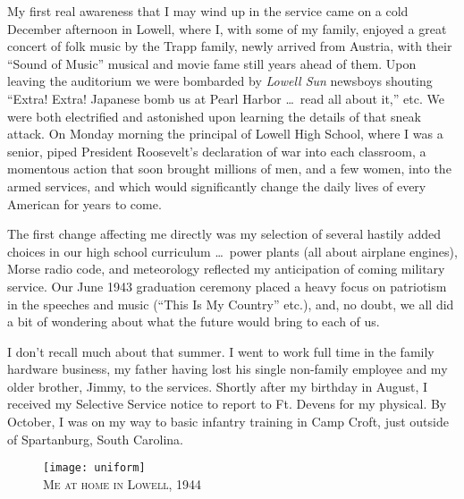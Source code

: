 \documentclass[../m3y]{subfiles}
\begin{document}
My first real awareness that I may wind up in the service came on a cold December afternoon in Lowell, where I, with some of my family, enjoyed a great concert of folk music by the Trapp family, newly arrived from Austria, with their ``Sound of Music'' musical and movie fame still years ahead of them. Upon leaving the auditorium we were bombarded by \emph{Lowell Sun} newsboys shouting ``Extra! Extra! Japanese bomb us at Pearl Harbor \ldots\ read all about it,'' etc. We were both electrified and astonished upon learning the details of that sneak attack. On Monday morning the principal of Lowell High School, where I was a senior, piped President Roosevelt's declaration of war into each classroom, a momentous action that soon brought millions of men, and a few women, into the armed services, and which would significantly change the daily lives of every American for years to come.

The first change affecting me directly was my selection of several hastily added choices in our high school curriculum \ldots\ power plants (all about airplane engines), Morse radio code, and meteorology reflected my anticipation of coming military service. Our June 1943 graduation ceremony placed a heavy focus on patriotism in the speeches and music (``This Is My Country'' etc.), and, no doubt, we all did a bit of wondering about what the future would bring to each of us.

I don't recall much about that summer. I went to work full time in the family hardware business, my father having lost his single non-family employee and my older brother, Jimmy, to the services. Shortly after my  birthday in August, I received my Selective Service notice to report to Ft. Devens for my physical. By October, I was on my way to basic infantry training in Camp Croft, just outside of Spartanburg, South Carolina.

\begin{figure}
\centering
\texttt{[image: uniform]}\\
\medskip
{\newtimes\textsc{Me at home in Lowell, 1944}}
\end{figure}
\end{document}
